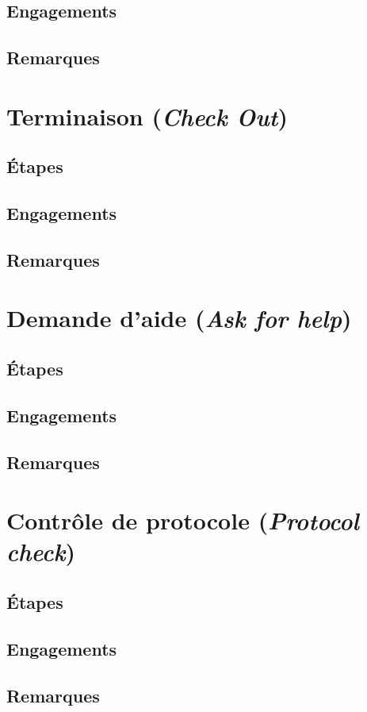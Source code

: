 \documentclass{book}
\begin{document}
\subsection{Engagements}
\subsection{Remarques}

\section{Terminaison (\emph{Check Out})}
\subsection{Étapes}
\subsection{Engagements}
\subsection{Remarques}

\section{Demande d'aide (\emph{Ask for help})}
\subsection{Étapes}
\subsection{Engagements}
\subsection{Remarques}

\section{Contrôle de protocole (\emph{Protocol check})}
\subsection{Étapes}
\subsection{Engagements}
\subsection{Remarques}
\end{document}
